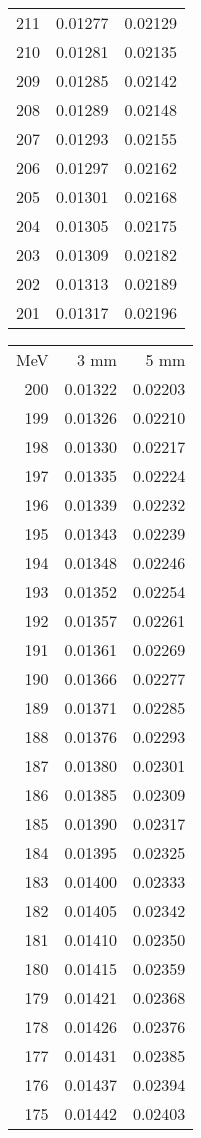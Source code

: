 \documentclass[11pt]{article}
\begin{document}
\begin{minipage}[l]{.3\linewidth}
\begin{tabular}{r|rr}
211&0.01277&0.02129\\ 
210&0.01281&0.02135\\ 
209&0.01285&0.02142\\ 
208&0.01289&0.02148\\ 
207&0.01293&0.02155\\ 
206&0.01297&0.02162\\ 
205&0.01301&0.02168\\ 
204&0.01305&0.02175\\ 
203&0.01309&0.02182\\ 
202&0.01313&0.02189\\ 
201&0.01317&0.02196\\ 
\end{tabular}
\end{minipage}
\hfill
\begin{minipage}[l]{.3\linewidth}
\begin{tabular}{r|rr}
MeV&3 mm&5 mm\\
200&0.01322&0.02203\\
199&0.01326&0.02210\\ 
198&0.01330&0.02217\\ 
197&0.01335&0.02224\\ 
196&0.01339&0.02232\\ 
195&0.01343&0.02239\\ 
194&0.01348&0.02246\\ 
193&0.01352&0.02254\\ 
192&0.01357&0.02261\\ 
191&0.01361&0.02269\\ 
190&0.01366&0.02277\\ 
189&0.01371&0.02285\\ 
188&0.01376&0.02293\\ 
187&0.01380&0.02301\\ 
186&0.01385&0.02309\\ 
185&0.01390&0.02317\\ 
184&0.01395&0.02325\\ 
183&0.01400&0.02333\\ 
182&0.01405&0.02342\\ 
181&0.01410&0.02350\\
180&0.01415&0.02359\\ 
179&0.01421&0.02368\\ 
178&0.01426&0.02376\\ 
177&0.01431&0.02385\\ 
176&0.01437&0.02394\\ 
175&0.01442&0.02403\\ 

\end{tabular}
\end{minipage}
\end{document}
